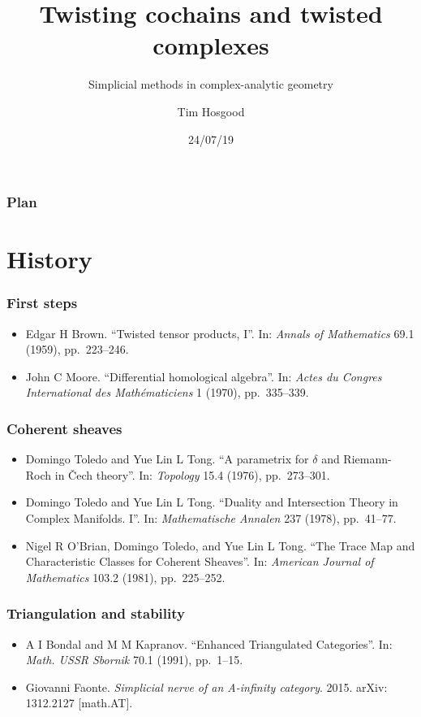 \documentclass{beamer}
\title{Twisting cochains and twisted complexes}
\subtitle{Simplicial methods in complex-analytic geometry}
\author{Tim Hosgood}
\institute{Université d'Aix-Marseille\\\url{https://thosgood.github.io}}
\date{24/07/19}
\begin{document}
    \begin{frame}
        \titlepage
    \end{frame}

    \begin{frame}
        \frametitle{Plan}
        \tableofcontents
    \end{frame}


    \section{History}

        \begin{frame}\frametitle{First steps}
            \begin{itemize}
                \item Edgar H Brown. ``Twisted tensor products, I''. In: \emph{Annals of Mathematics} 69.1 (1959), pp.~223--246.
                \item John C Moore. ``Differential homological algebra''. In: \emph{Actes du Congres International des Mathématiciens} 1 (1970), pp.~335--339.
            \end{itemize}
        \end{frame}

        \begin{frame}\frametitle{Coherent sheaves}
            \begin{itemize}
                \item Domingo Toledo and Yue Lin L Tong. ``A parametrix for $\delta$ and Riemann-Roch in Čech theory''. In: \emph{Topology} 15.4 (1976), pp.~273--301.
                \item Domingo Toledo and Yue Lin L Tong. ``Duality and Intersection Theory in Complex Manifolds. I''. In: \emph{Mathematische Annalen} 237 (1978), pp.~41--77.
                \item Nigel R O'Brian, Domingo Toledo, and Yue Lin L Tong. ``The Trace Map and Characteristic Classes for Coherent Sheaves''. In: \emph{American Journal of Mathematics} 103.2 (1981), pp.~225--252.
            \end{itemize}
        \end{frame}

        \begin{frame}\frametitle{Triangulation and stability}
            \begin{itemize}
                \item A I Bondal and M M Kapranov. ``Enhanced Triangulated Categories''. In: \emph{Math. USSR Sbornik} 70.1 (1991), pp.~1--15.
                \item Giovanni Faonte. \emph{Simplicial nerve of an A-infinity category}. 2015. arXiv: 1312.2127 [math.AT].
            \end{itemize}
        \end{frame}
\end{document}
